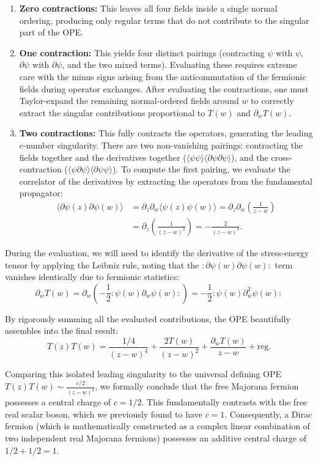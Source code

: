 \begin{enumerate}
    \item \textbf{Zero contractions:} This leaves all four fields inside a single normal ordering, producing only regular terms that do not contribute to the singular part of the OPE.

    \item \textbf{One contraction:} This yields four distinct pairings (contracting \(\psi\) with \(\psi\), \(\partial\psi\) with \(\partial\psi\), and the two mixed terms). Evaluating these requires extreme care with the minus signs arising from the anticommutation of the fermionic fields during operator exchanges. After evaluating the contractions, one must Taylor-expand the remaining normal-ordered fields around \(w\) to correctly extract the singular contributions proportional to \(T(w)\) and \(\partial_w T(w)\).

    \item \textbf{Two contractions:} This fully contracts the operators, generating the leading c-number singularity. There are two non-vanishing pairings: contracting the fields together and the derivatives together (\(\langle\psi\psi\rangle\langle\partial\psi\partial\psi\rangle\)), and the cross-contraction (\(\langle\psi\partial\psi\rangle\langle\partial\psi\psi\rangle\)). To compute the first pairing, we evaluate the correlator of the derivatives by extracting the operators from the fundamental propagator:
          \[
              \begin{aligned}
                  \langle \partial\psi(z) \partial\psi(w) \rangle & = \partial_z \partial_w \langle \psi(z)\psi(w) \rangle = \partial_z \partial_w \left( \frac{1}{z-w} \right) \\
                                                                  & = \partial_z \left( \frac{1}{(z-w)^2} \right) = -\frac{2}{(z-w)^3}.
              \end{aligned}
          \]
\end{enumerate}

During the evaluation, we will need to identify the derivative of the stress-energy tensor by applying the Leibniz rule, noting that the \(: \partial\psi(w)\partial\psi(w) :\) term vanishes identically due to fermionic statistics:
\[
    \partial_w T(w) = \partial_w \left( -\frac{1}{2} :\psi(w)\partial_w\psi(w): \right) = -\frac{1}{2} :\psi(w)\partial_w^2\psi(w):
\]

By rigorously summing all the evaluated contributions, the OPE beautifully assembles into the final result:
\[
    T(z)T(w) = \frac{1/4}{(z-w)^4} + \frac{2T(w)}{(z-w)^2} + \frac{\partial_w T(w)}{z-w} + \text{reg.}
\]

Comparing this isolated leading singularity to the universal defining OPE \(T(z)T(w) \sim \frac{c/2}{(z-w)^4}\), we formally conclude that the free Majorana fermion possesses a central charge of \(c = 1/2\). This fundamentally contrasts with the free real scalar boson, which we previously found to have \(c = 1\). Consequently, a Dirac fermion (which is mathematically constructed as a complex linear combination of two independent real Majorana fermions) possesses an additive central charge of \(1/2 + 1/2 = 1\).